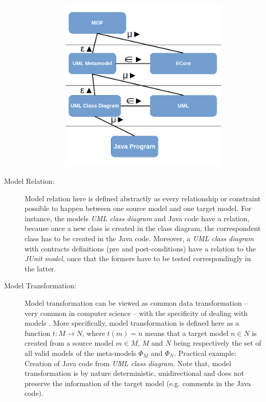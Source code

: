 \documentclass[tuberlin,cic,tc,english,noabntcite]{iiufrgs}
\begin{document}
\begin{description}
\begin{figure}[h]
\begin{subfigure}[h]{.49\textwidth}
			\includegraphics[width=\textwidth]{model_scheme_practice}
		\end{subfigure}
		\label{fig:model_scheme}
	\end{figure}
	
	\item[Model Relation:] Model relation here is defined abstractly as every relationship or constraint possible to happen between one source model and one target model. For instance, the models \emph{UML class diagram} and Java code have a relation, because once a new class is created in the class diagram, the correspondent class has to be created in the Java code. Moreover, a \emph{UML class diagram} with contracts definitions (pre and post-conditions) have a relation to the \emph{JUnit model}, once that the formers have to be tested correspondingly in the latter.

	\item[Model Transformation:] Model transformation can be viewed as common data transformation – very common in computer science – with the specificity of dealing with models \cite{czarnecki2006feature}. More specifically, model transformation is defined here as a function $t : M \rightarrow N$, where $t(m) = n$ means that a target model $n \in N$ is created from a source model $m \in M$, $M$ and $N$ being respectively the set of all valid models of the meta-models $\Phi_M$ and $\Phi_N$. Practical example: Creation of Java code from \emph{UML class diagram}. Note that, model transformation is by nature deterministic, unidirectional and does not preserve the information of the target model (e.g. comments in the Java code).


\end{description}
\end{document}
